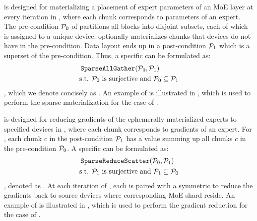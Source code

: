 \textbf{\collsag} is designed for materializing a placement of expert parameters of an MoE layer at every iteration in \yyy, where each chunk corresponds to parameters of an expert.
The pre-condition $\mathcal{P}_0$ of \collsag partitions all blocks into disjoint subsets, each of which is assigned to a unique device. \collsag optionally materializes chunks that devices do not have in the pre-condition. Data layout ends up in a post-condition $\mathcal{P}_1$ which is a superset of the pre-condition. Thus, a specific \collsag can be formulated as:
\begin{align*}
    & \operatorname{\texttt{SparseAllGather}}(\mathcal{P}_0, \mathcal{P}_1) \\
    & \text{s.t. } \mathcal{P}_0 \text{ is surjective and } \mathcal{P}_0 \subseteq \mathcal{P}_1
\end{align*}
, which we denote concisely as .
An example of \collsag is illustrated in , which is used to perform the sparse materialization for the case of .

\textbf{\collsrs} is designed for reducing gradients of the ephemerally materialized experts to specified devices in \yyy, where each chunk corresponds to gradients of an expert. For \collsrs, each chunk $c$ in the post-condition $\mathcal{P}_1$ has a value summing up all chunks $c$ in the pre-condition $\mathcal{P}_0$. 
A specific \collsrs can be formulated as:
\begin{align*}
    & \operatorname{\texttt{SparseReduceScatter}}(\mathcal{P}_0, \mathcal{P}_1) \\
    & \text{s.t. } \mathcal{P}_1 \text{ is surjective and } \mathcal{P}_1 \subseteq \mathcal{P}_0
\end{align*}
, denoted as .
At each iteration of \yyy, each  is paired with a symmetric  to reduce the gradients back to source devices where corresponding MoE shard reside.
An example of \collsrs is illustrated in , which is used to perform the gradient reduction for the case of .

